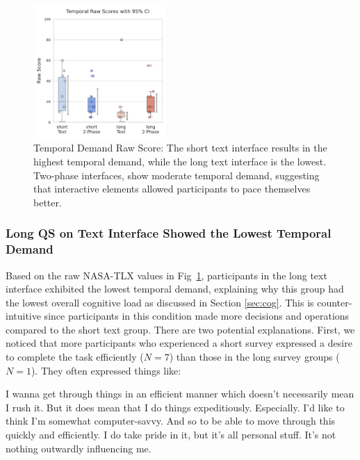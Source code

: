 \begin{figure} %
    \centering
    \includegraphics[width=0.45\textwidth, trim=0 13 0 13, clip]{content/image/cog/Temporal_scores.pdf}
    \captionsetup{width=0.45\textwidth, justification=justified} %
    \caption{Temporal Demand Raw Score: The short text interface results in the highest temporal demand, while the long text interface is the lowest. Two-phase interfaces, show moderate temporal demand, suggesting that interactive elements allowed participants to pace themselves better.}
    \label{fig:temporal_cog_score}
\end{figure}

\subsubsection{Long QS on Text Interface Showed the Lowest Temporal Demand} Based on the raw NASA-TLX values in Fig~\ref{fig:temporal_cog_score}, participants in the long text interface exhibited the lowest temporal demand, explaining why this group had the lowest overall cognitive load 
as discussed in Section \ref{sec:cog}. This is counter-intuitive since participants in this condition made more decisions and operations compared to the short text group. There are two potential explanations. First, we noticed that more participants who experienced a short survey expressed a desire to complete the task efficiently ($N=7$) than those in the long survey groups ($N=1$). They often expressed things like:

\begin{displayquote}
I wanna get through things in an efficient manner which doesn't necessarily mean I rush it. But it does mean that I do things expeditiously. Especially. I'd like to think I'm somewhat computer-savvy. And so to be able to move through this quickly and efficiently. I do take pride in it, but it's all personal stuff. It's not nothing outwardly influencing me.  \hfill{}
\end{displayquote}

